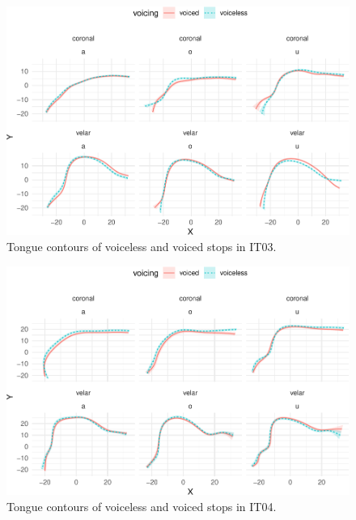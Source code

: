 \documentclass[12pt,]{article}
\begin{document}
\begin{figure}

{\centering \includegraphics[width=.8\textwidth]{2018-polar-gam_files/figure-latex/tongues-it03-1} 

}

\caption{Tongue contours of voiceless and voiced stops in IT03.}\label{f:tongues-it03}
\end{figure}

\begin{figure}

{\centering \includegraphics[width=.8\textwidth]{2018-polar-gam_files/figure-latex/tongues-it04-1} 

}

\caption{Tongue contours of voiceless and voiced stops in IT04.}\label{f:tongues-it04}
\end{figure}


\end{document}
